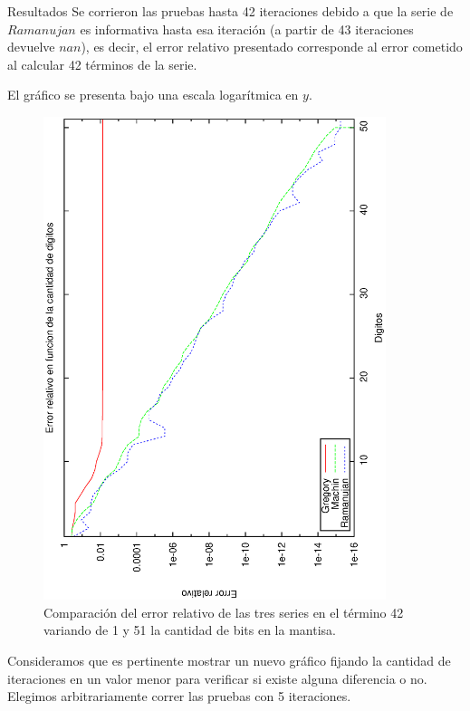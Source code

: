 \begin{section}{Resultados}
	Se corrieron las pruebas hasta 42 iteraciones debido a que la serie de $Ramanujan$ es informativa hasta esa iteración (a partir de 43 iteraciones devuelve $nan$), es decir, el error relativo presentado corresponde al error cometido al calcular 42 términos de la serie.
	
	El gráfico se presenta bajo una escala logarítmica en $y$.
	
	\begin{figure}[H]
	  \centering
		\includegraphics[width=10cm,angle=-90]{graficos/comparacion_42it_1a51p.eps}
	  \caption{Comparación del error relativo de las tres series en el término 42 variando de 1 y 51 la cantidad de bits en la mantisa.}
	  \label{fig:42it}
	\end{figure}
	
	\VSP
	
	Consideramos que es pertinente mostrar un nuevo gráfico fijando la cantidad de iteraciones en un valor menor para verificar si existe alguna diferencia o no. Elegimos arbitrariamente correr las pruebas con 5 iteraciones.
	

\end{section}

